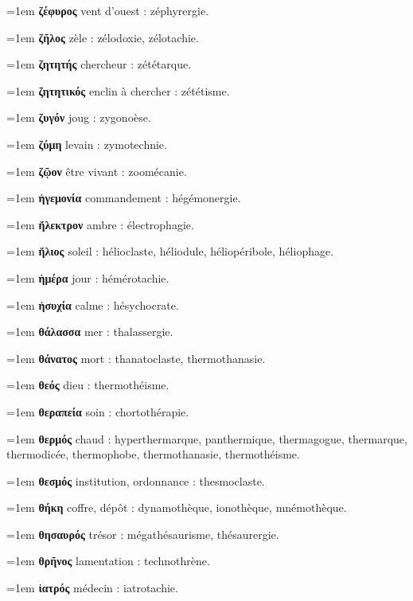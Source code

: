 \hangindent=1em \textbf{ζέφυρος} vent d'ouest : zéphyrergie.\par
\hangindent=1em \textbf{ζῆλος} zèle : zélodoxie, zélotachie.\par
\hangindent=1em \textbf{ζητητής} chercheur : zététarque.\par
\hangindent=1em \textbf{ζητητικός} enclin à chercher : zététisme.\par
\hangindent=1em \textbf{ζυγόν} joug : zygonoèse.\par
\hangindent=1em \textbf{ζύμη} levain : zymotechnie.\par
\hangindent=1em \textbf{ζῷον} être vivant : zoomécanie.\par
\hangindent=1em \textbf{ἡγεμονία} commandement : hégémonergie.\par
\hangindent=1em \textbf{ἤλεκτρον} ambre : électrophagie.\par
\hangindent=1em \textbf{ἥλιος} soleil : hélioclaste, héliodule, héliopéribole, héliophage.\par
\hangindent=1em \textbf{ἡμέρα} jour : hémérotachie.\par
\hangindent=1em \textbf{ἡσυχία} calme : hésychocrate.\par
\hangindent=1em \textbf{θάλασσα} mer : thalassergie.\par
\hangindent=1em \textbf{θάνατος} mort : thanatoclaste, thermothanasie.\par
\hangindent=1em \textbf{θεός} dieu : thermothéisme.\par
\hangindent=1em \textbf{θεραπεία} soin : chortothérapie.\par
\hangindent=1em \textbf{θερμός} chaud : hyperthermarque, panthermique, thermagogue, thermarque, thermodicée, thermophobe, thermothanasie, thermothéisme.\par
\hangindent=1em \textbf{θεσμός} institution, ordonnance : thesmoclaste.\par
\hangindent=1em \textbf{θήκη} coffre, dépôt : dynamothèque, ionothèque, mnémothèque.\par
\hangindent=1em \textbf{θησαυρός} trésor : mégathésaurisme, thésaurergie.\par
\hangindent=1em \textbf{θρῆνος} lamentation : technothrène.\par
\hangindent=1em \textbf{ἰατρός} médecin : iatrotachie.\par
